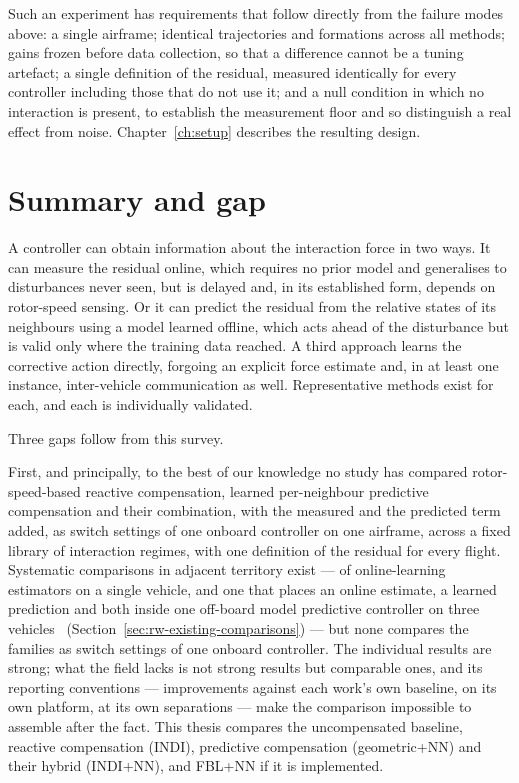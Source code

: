 Such an experiment has requirements that follow directly from the failure modes above: a single
airframe; identical trajectories and formations across all methods; gains frozen before data
collection, so that a difference cannot be a tuning artefact; a single definition
of the residual, measured identically for every controller
including those that do not use it; and a null condition in which no interaction is present, to
establish the measurement floor and so distinguish a real effect from noise. Chapter~\ref{ch:setup}
describes the resulting design.

\section{Summary and gap}
\label{sec:rw-gap}

A controller can obtain information about the interaction force in two ways. It can measure the
residual online, which requires no prior model and generalises to disturbances never seen, but is
delayed and, in its established form, depends on rotor-speed sensing. Or it can predict the
residual from the relative states of its neighbours using a model learned offline, which acts ahead
of the disturbance but is valid only where the training data reached. A third approach learns the
corrective action directly, forgoing an explicit force estimate and, in at least one instance,
inter-vehicle communication as well. Representative methods exist for each, and each is
individually validated.

Three gaps follow from this survey.

First, and principally, to the best of our knowledge no study has compared rotor-speed-based reactive compensation, learned per-neighbour predictive compensation and their combination, with the measured and the predicted term added, as switch settings of one onboard controller on one airframe, across a fixed library of interaction regimes, with one definition of the residual for every flight. Systematic comparisons in adjacent territory exist --- of online-learning estimators on a single vehicle, and one that places an online estimate, a learned prediction and both inside one off-board model predictive controller on three vehicles~\cite{hsieh2025onlineadaptation} (Section~\ref{sec:rw-existing-comparisons}) --- but none compares the families as switch settings of one onboard controller. The individual results are strong; what the field lacks is not strong results
but comparable ones, and its reporting conventions --- improvements against each work's own
baseline, on its own platform, at its own separations --- make the comparison impossible to
assemble after the fact. This thesis compares the uncompensated baseline, reactive compensation
(INDI), predictive compensation (geometric+NN) and their hybrid (INDI+NN), and FBL+NN if it is
implemented.

